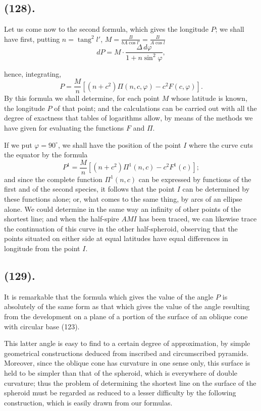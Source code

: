 \documentclass{article}
\begin{document}
\subsection*{(128).}

Let us come now to the second formula, which gives the longitude $P$; we shall have first, putting $n=\operatorname{tang}^{2}l'$, $M=\frac{B}{bA\cos l'}=\frac{B}{A\cos l}$
\[ dP=M\cdot\frac{\Delta\,d\varphi}{1+n\sin^{2}\varphi}, \]

hence, integrating,
\[ P=\frac{M}{n}[(n+c^{2})\Pi(n,c,\varphi)-c^{2}F(c,\varphi)]. \]
By this formula we shall determine, for each point $M$ whose latitude is known, the longitude $P$ of that point; and the calculations can be carried out with all the degree of exactness that tables of logarithms allow, by means of the methods we have given for evaluating the functions $F$ and $\Pi$.

If we put $\varphi=90^{\circ}$, we shall have the position of the point $I$ where the curve cuts the equator by the formula
\[ P^{1}=\frac{M}{n}[(n+c^{2})\Pi^{1}(n,c)-c^{2}F^{1}(c)]; \]
and since the complete function $\Pi^{1}(n,c)$ can be expressed by functions of the first and of the second species, it follows that the point $I$ can be determined by these functions alone; or, what comes to the same thing, by arcs of an ellipse alone. We could determine in the same way an infinity of other points of the shortest line; and when the half-spire $AMI$ has been traced, we can likewise trace the continuation of this curve in the other half-spheroid, observing that the points situated on either side at equal latitudes have equal differences in longitude from the point $I$.

\subsection*{(129).}

It is remarkable that the formula which gives the value of the angle $P$ is absolutely of the same form as that which gives the value of the angle resulting from the development on a plane of a portion of the surface of an oblique cone with circular base (123).

This latter angle is easy to find to a certain degree of approximation, by simple geometrical constructions deduced from inscribed and circumscribed pyramids. Moreover, since the oblique cone has curvature in one sense only, this surface is held to be simpler than that of the spheroid, which is everywhere of double curvature; thus the problem of determining the shortest line on the surface of the spheroid must be regarded as reduced to a lesser difficulty by the following construction, which is easily drawn from our formulas.
\end{document}
